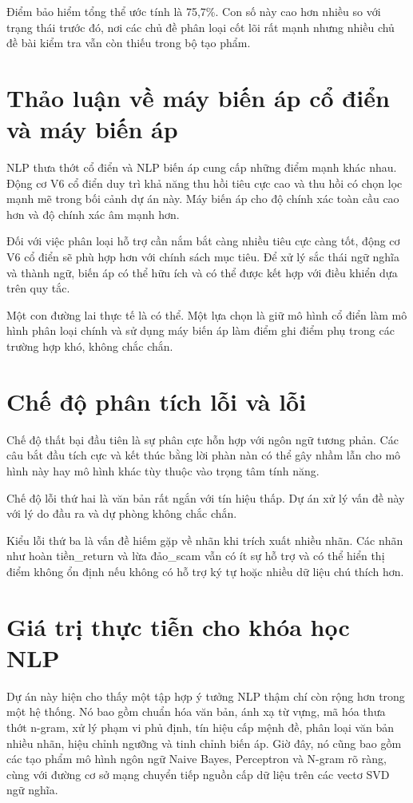 \documentclass[12pt,a4paper]{article}
\begin{document}
Điểm bảo hiểm tổng thể ước tính là 75,7\%. Con số này cao hơn nhiều so với trạng thái trước đó, nơi các chủ đề phân loại cốt lõi rất mạnh nhưng nhiều chủ đề bài kiểm tra vẫn còn thiếu trong bộ tạo phẩm.

\section{Thảo luận về máy biến áp cổ điển và máy biến áp}
NLP thưa thớt cổ điển và NLP biến áp cung cấp những điểm mạnh khác nhau. Động cơ V6 cổ điển duy trì khả năng thu hồi tiêu cực cao và thu hồi có chọn lọc mạnh mẽ trong bối cảnh dự án này. Máy biến áp cho độ chính xác toàn cầu cao hơn và độ chính xác âm mạnh hơn.

Đối với việc phân loại hỗ trợ cần nắm bắt càng nhiều tiêu cực càng tốt, động cơ V6 cổ điển sẽ phù hợp hơn với chính sách mục tiêu. Để xử lý sắc thái ngữ nghĩa và thành ngữ, biến áp có thể hữu ích và có thể được kết hợp với điều khiển dựa trên quy tắc.

Một con đường lai thực tế là có thể. Một lựa chọn là giữ mô hình cổ điển làm mô hình phân loại chính và sử dụng máy biến áp làm điểm ghi điểm phụ trong các trường hợp khó, không chắc chắn.

\section{Chế độ phân tích lỗi và lỗi}
Chế độ thất bại đầu tiên là sự phân cực hỗn hợp với ngôn ngữ tương phản. Các câu bắt đầu tích cực và kết thúc bằng lời phàn nàn có thể gây nhầm lẫn cho mô hình này hay mô hình khác tùy thuộc vào trọng tâm tính năng.

Chế độ lỗi thứ hai là văn bản rất ngắn với tín hiệu thấp. Dự án xử lý vấn đề này với lý do đầu ra và dự phòng không chắc chắn.

Kiểu lỗi thứ ba là vấn đề hiếm gặp về nhãn khi trích xuất nhiều nhãn. Các nhãn như hoàn tiền\_return và lừa đảo\_scam vẫn có ít sự hỗ trợ và có thể hiển thị điểm không ổn định nếu không có hỗ trợ ký tự hoặc nhiều dữ liệu chú thích hơn.

\section{Giá trị thực tiễn cho khóa học NLP}
Dự án này hiện cho thấy một tập hợp ý tưởng NLP thậm chí còn rộng hơn trong một hệ thống. Nó bao gồm chuẩn hóa văn bản, ánh xạ từ vựng, mã hóa thưa thớt n-gram, xử lý phạm vi phủ định, tín hiệu cấp mệnh đề, phân loại văn bản nhiều nhãn, hiệu chỉnh ngưỡng và tinh chỉnh biến áp. Giờ đây, nó cũng bao gồm các tạo phẩm mô hình ngôn ngữ Naive Bayes, Perceptron và N-gram rõ ràng, cùng với đường cơ sở mạng chuyển tiếp nguồn cấp dữ liệu trên các vectơ SVD ngữ nghĩa.
\end{document}
